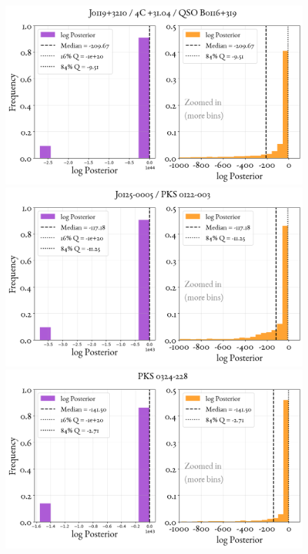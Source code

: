 \begin{figure}
    \centering
    \includegraphics[width=0.8\linewidth]{figures/ResultPosteriors/8_Posterior_182.png}\\
     \includegraphics[width=0.8\linewidth]{figures/ResultPosteriors/9_Posterior_201.png}\\
      \includegraphics[width=0.8\linewidth]{figures/ResultPosteriors/16_Posterior_1070.png}  
\end{figure}

